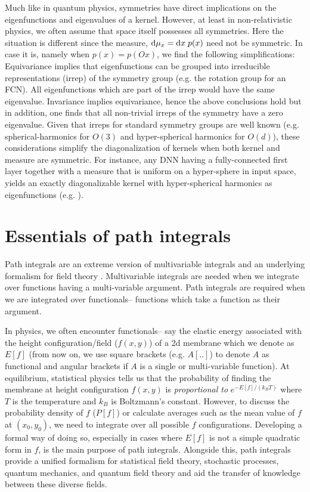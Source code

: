 Much like in quantum physics, symmetries have direct implications on the eigenfunctions and eigenvalues of a kernel. However, at least in non-relativistic physics, we often assume that space itself possesses all symmetries. Here the situation is different since the measure, $\text{d}\mu_x=\text{d} x \; p(x)$ need not be symmetric. In case it is, namely when $p(x)=p(Ox)$, we find the following simplifications: Equivariance implies that eigenfunctions can be grouped into irreducible representations (irrep) of the symmetry group (e.g. the rotation group for an FCN). All eigenfunctions which are part of the irrep would have the same eigenvalue. Invariance implies equivariance, hence the above conclusions hold but in addition, one finds that all non-trivial irreps of the symmetry have a zero eigenvalue. Given that irreps for standard symmetry groups are well known (e.g. spherical-harmonics for $O(3)$ and hyper-spherical harmonics for $O(d)$), these considerations simplify the diagonalization of kernels when both kernel and measure are symmetric. For instance, any DNN having a fully-connected first layer together with a measure that is uniform on a hyper-sphere in input space, yields an exactly diagonalizable kernel with hyper-spherical harmonics as eigenfunctions (e.g. \cite{cohen2021learning}). 

\section{Essentials of path integrals}
\label{Sec:PathIntegrals}
Path integrals are an extreme version of multivariable integrals and an underlying formalism for field theory \cite{schulman1996}. Multivariable integrals are needed when we integrate over functions having a multi-variable argument. Path integrals are required when we are integrated over functionals-- functions which take a function as their argument.  

In physics, we often encounter functionals-- say the elastic energy associated with the height configuration/field ($f(x,y)$) of a 2d membrane which we denote as $E[f]$ (from now on, we use square brackets (e.g. $A[..]$) to denote $A$ as functional and angular brackets if $A$ is a single or multi-variable function). At equilibrium, statistical physics tells us that the probability of finding the membrane at height configuration $f(x,y)$ is {\it proportional to} $e^{-E[f]/(k_B T)}$ where $T$ is the temperature and $k_B$ is Boltzmann's constant. However, to discuss the probability density of $f$ ($P[f]$) or calculate averages such as the mean value of $f$ at $(x_0,y_0)$, we need to integrate over all possible $f$ configurations. Developing a formal way of doing so, especially in cases where $E[f]$ is not a simple quadratic form in $f$, is the main purpose of path integrals. Alongside this, path integrals provide a unified formalism for statistical field theory, stochastic processes, quantum mechanics, and quantum field theory and aid the transfer of knowledge between these diverse fields. 

